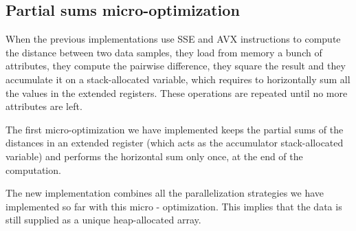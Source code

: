 \documentclass{article}
\begin{document}

\hypertarget{micro-optimization-partial-sum}{%
\subsection{Partial sums micro-optimization}\label{micro-optimization-partial-sum}}

When the previous implementations use SSE and AVX instructions to compute the distance between
two data samples, they load from memory a bunch of attributes, they compute the pairwise
difference, they square the result and they accumulate it on a stack-allocated variable, which
requires to horizontally sum all the values in the extended registers.
These operations are repeated until no more attributes are left.

The first micro-optimization we have implemented keeps the partial sums of the distances in an
extended register (which acts as the accumulator stack-allocated variable) and performs the
horizontal sum only once, at the end of the computation.

The new implementation combines all the parallelization strategies we have implemented so far
with this micro - optimization.
This implies that the data is still supplied as a unique heap-allocated array.
\end{document}
